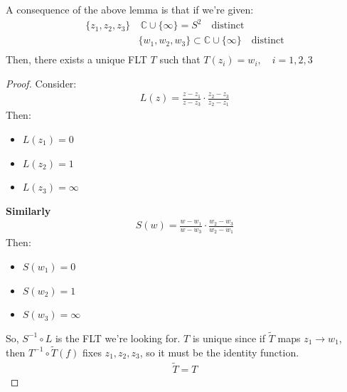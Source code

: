 \begin{proposition}
    A consequence of the above lemma is that if we're given:
    \begin{align*}
        \{z_1, z_2, z_3\} & \ \mathbb{C} \cup \{\infty\} = S^2  \quad \text{distinct}                  \\
                          & \{w_1, w_2, w_3\} \subset \mathbb{C} \cup \{\infty\} \quad \text{distinct} \\
    \end{align*}
    Then, there exists a unique FLT $T$ such that $T(z_i) = w_i,\quad i = 1, 2, 3$
\end{proposition}
\begin{proof}
    Consider:
    \begin{align*}
        L(z) = \frac{z - z_1}{z - z_3} \cdot \frac{z_2 - z_3}{z_2 - z_1}
    \end{align*}
    Then:
    \begin{itemize}
        \item $L(z_1) = 0$
        \item $L(z_2) = 1$
        \item $L(z_3) = \infty$
    \end{itemize}
    \textbf{Similarly}
    \begin{align*}
        S(w) = \frac{w - w_1}{w - w_3} \cdot \frac{w_2 - w_3}{w_2 - w_1}
    \end{align*}
    Then:
    \begin{itemize}
        \item $S(w_1) = 0$
        \item $S(w_2) = 1$
        \item $S(w_3) = \infty$
    \end{itemize}
    So, $S^{-1} \circ L$ is the FLT we're looking for. $T$ is unique since if $\tilde{T}$ maps $z_1 \to w_1$, then $T^{-1} \circ \tilde{T} (f)$ fixes $z_1, z_2, z_3$, so it must be the identity function.
    \begin{align*}
        \tilde{T} = T
    \end{align*}
\end{proof}